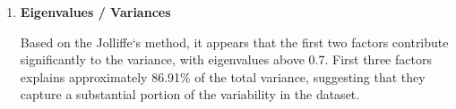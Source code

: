 \documentclass[11pt]{article}
\begin{document}
			\begin{enumerate}
				\item \textbf{Eigenvalues / Variances} 
				\begin{table}[h]
					\centering
					\label{tab:eigen_val}
				\end{table}
				
				Based on the Jolliffe`s method, it appears that the first two factors contribute significantly to the variance, with eigenvalues above 0.7. First three factors explains approximately 86.91\% of the total variance, suggesting that they capture a substantial portion of the variability in the dataset.
				

\end{enumerate}
\end{document}
